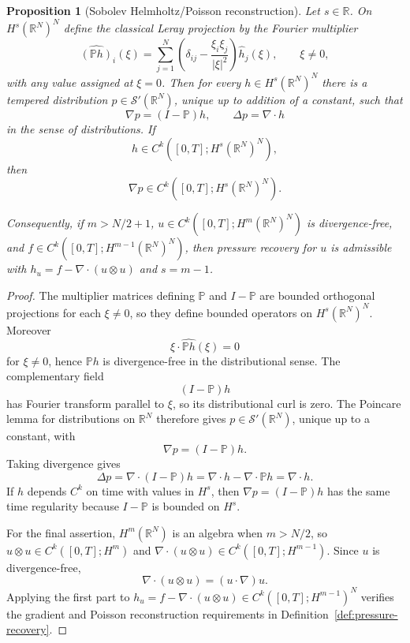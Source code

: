 \documentclass{amsart}
\newtheorem{prop}{Proposition}
\newcommand{\abs}[1]{\left\lvert #1\right\rvert}
\begin{document}
\begin{prop}[Sobolev Helmholtz/Poisson reconstruction]\label{prop:sobolev-pressure-recovery}
Let $s\in\mathbb{R}$.  On $H^s(\mathbb{R}^N)^N$ define the classical Leray
projection by the Fourier multiplier
\[
  \widehat{(\mathbb{P}h)}_i(\xi)
  =
  \sum_{j=1}^N
  \left(\delta_{ij}-\frac{\xi_i\xi_j}{\abs{\xi}^2}\right)\widehat h_j(\xi),
  \qquad \xi\neq0,
\]
with any value assigned at $\xi=0$.  Then for every
$h\in H^s(\mathbb{R}^N)^N$ there is a tempered distribution
$p\in\mathcal S'(\mathbb{R}^N)$, unique up to addition of a constant, such
that
\[
  \nabla p=(I-\mathbb{P})h,
  \qquad
  \Delta p=\nabla\cdot h
\]
in the sense of distributions.  If
\[
  h\in C^k([0,T];H^s(\mathbb{R}^N)^N),
\]
then
\[
  \nabla p\in C^k([0,T];H^s(\mathbb{R}^N)^N).
\]

Consequently, if $m>N/2+1$, $u\in C^k([0,T];H^m(\mathbb{R}^N)^N)$ is
divergence-free, and $f\in C^k([0,T];H^{m-1}(\mathbb{R}^N)^N)$, then
pressure recovery for $u$ is admissible with
$h_u=f-\nabla\cdot(u\otimes u)$ and $s=m-1$.
\end{prop}

\begin{proof}
The multiplier matrices defining $\mathbb{P}$ and $I-\mathbb{P}$ are bounded
orthogonal projections for each $\xi\neq0$, so they define bounded operators
on $H^s(\mathbb{R}^N)^N$.  Moreover
\[
  \xi\cdot\widehat{\mathbb{P}h}(\xi)=0
\]
for $\xi\neq0$, hence $\mathbb{P}h$ is divergence-free in the distributional
sense.  The complementary field
\[
  (I-\mathbb{P})h
\]
has Fourier transform parallel to $\xi$, so its distributional curl is zero.
The Poincare lemma for distributions on $\mathbb{R}^N$ therefore gives
$p\in\mathcal S'(\mathbb{R}^N)$, unique up to a constant, with
\[
  \nabla p=(I-\mathbb{P})h .
\]
Taking divergence gives
\[
  \Delta p=\nabla\cdot(I-\mathbb{P})h
  =\nabla\cdot h-\nabla\cdot\mathbb{P}h
  =\nabla\cdot h .
\]
If $h$ depends $C^k$ on time with values in $H^s$, then
$\nabla p=(I-\mathbb{P})h$ has the same time regularity because
$I-\mathbb{P}$ is bounded on $H^s$.

For the final assertion, $H^m(\mathbb{R}^N)$ is an algebra when $m>N/2$, so
$u\otimes u\in C^k([0,T];H^m)$ and
$\nabla\cdot(u\otimes u)\in C^k([0,T];H^{m-1})$.  Since $u$ is
divergence-free,
\[
  \nabla\cdot(u\otimes u)=(u\cdot\nabla)u .
\]
Applying the first part to
$h_u=f-\nabla\cdot(u\otimes u)\in C^k([0,T];H^{m-1})^N$ verifies the
gradient and Poisson reconstruction requirements in
Definition~\ref{def:pressure-recovery}.
\end{proof}
\end{document}
